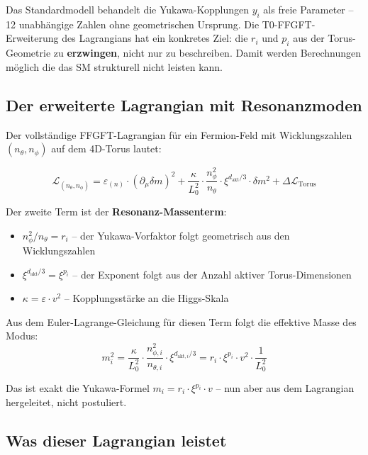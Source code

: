 Das Standardmodell behandelt die Yukawa-Kopplungen $y_i$ als freie
Parameter -- 12 unabhängige Zahlen ohne geometrischen Ursprung.
Die T0-FFGFT-Erweiterung des Lagrangians hat ein konkretes Ziel:
die $r_i$ und $p_i$ aus der Torus-Geometrie zu \textbf{erzwingen},
nicht nur zu beschreiben. Damit werden Berechnungen möglich die
das SM strukturell nicht leisten kann.

\subsection{Der erweiterte Lagrangian mit Resonanzmoden}

Der vollständige FFGFT-Lagrangian für ein Fermion-Feld mit
Wicklungszahlen $(n_\theta, n_\phi)$ auf dem 4D-Torus lautet:

\begin{equation}
    \mathcal{L}_{(n_\theta, n_\phi)} = \varepsilon_{(n)} \cdot
    (\partial_\mu \delta m)^2
    + \frac{\kappa}{L_0^2} \cdot \frac{n_\phi^2}{n_\theta} \cdot
    \xi^{d_{\text{akt}}/3} \cdot \delta m^2
    + \Delta\mathcal{L}_{\text{Torus}}
    \label{eq:L_extended}
\end{equation}

Der zweite Term ist der \textbf{Resonanz-Massenterm}:
\begin{itemize}
    \item $n_\phi^2/n_\theta = r_i$ -- der Yukawa-Vorfaktor folgt
          geometrisch aus den Wicklungszahlen
    \item $\xi^{d_{\text{akt}}/3} = \xi^{p_i}$ -- der Exponent
          folgt aus der Anzahl aktiver Torus-Dimensionen
    \item $\kappa = \varepsilon \cdot v^2$ -- Kopplungsstärke
          an die Higgs-Skala
\end{itemize}

Aus dem Euler-Lagrange-Gleichung für diesen Term folgt die
effektive Masse des Modus:
\begin{equation}
    m_i^2 = \frac{\kappa}{L_0^2} \cdot \frac{n_{\phi,i}^2}{n_{\theta,i}}
    \cdot \xi^{d_{\text{akt},i}/3}
    = r_i \cdot \xi^{p_i} \cdot v^2 \cdot \frac{1}{L_0^2}
\end{equation}

Das ist exakt die Yukawa-Formel $m_i = r_i \cdot \xi^{p_i} \cdot v$
-- nun aber aus dem Lagrangian hergeleitet, nicht postuliert.

\subsection{Was dieser Lagrangian leistet}

